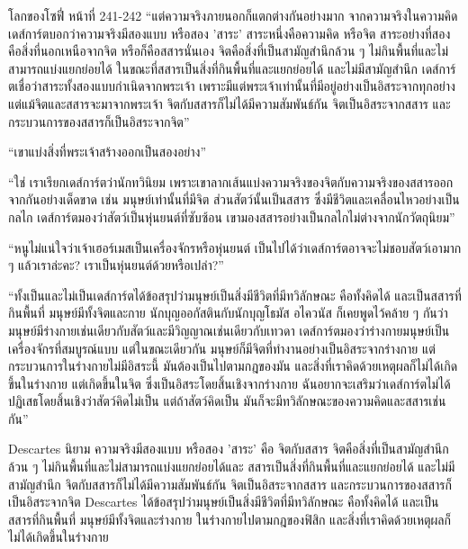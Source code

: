 \begin{bookquote}{โลกของโซฟี่ หน้าที่ 241-242}
“แต่ความจริงภายนอกก็แตกต่างกันอย่างมาก จากความจริงในความคิด เดส์การ์ตบอกว่าความจริงมีสองแบบ หรือสอง 'สาระ' สาระหนึ่งคือความคิด หรือจิต สาระอย่างที่สองคือสิ่งที่นอกเหนือจากจิต หรือก็คือสสารนั่นเอง จิตคือสิ่งที่เป็นสามัญสำนึกล้วน ๆ ไม่กินพื้นที่และไม่สามารถแบ่งแยกย่อยได้ ในขณะที่สสารเป็นสิ่งที่กินพื้นที่และแยกย่อยได้ และไม่มีสามัญสำนึก เดส์การ์ตเชื่อว่าสาระทั้งสองแบบกำเนิดจากพระเจ้า เพราะมีแต่พระเจ้าเท่านั้นที่มีอยู่อย่างเป็นอิสระจากทุกอย่าง แต่แม้จิตและสสารจะมาจากพระเจ้า จิตกับสสารก็ไม่ได้มีความสัมพันธ์กัน จิตเป็นอิสระจากสสาร และกระบวนการของสสารก็เป็นอิสระจากจิต”

“เขาแบ่งสิ่งที่พระเจ้าสร้างออกเป็นสองอย่าง”

“ใช่ เราเรียกเดส์การ์ตว่านักทวินิยม เพราะเขาลากเส้นแบ่งความจริงของจิตกับความจริงของสสารออกจากกันอย่างเด็ดขาด เช่น มนุษย์เท่านั้นที่มีจิต ส่วนสัตว์นั้นเป็นสสาร ซึ่งมีชีวิตและเคลื่อนไหวอย่างเป็นกลไก เดส์การ์ตมองว่าสัตว์เป็นหุ่นยนต์ที่ซับซ้อน เขามองสสารอย่างเป็นกลไกไม่ต่างจากนักวัตถุนิยม”

“หนูไม่แน่ใจว่าเจ้าเฮอร์เมสเป็นเครื่องจักรหรือหุ่นยนต์ เป็นไปได้ว่าเดส์การ์ตอาจจะไม่ชอบสัตว์เอามาก ๆ แล้วเราล่ะคะ? เราเป็นหุ่นยนต์ด้วยหรือเปล่า?”

“ทั้งเป็นและไม่เป็นเดส์การ์ตได้ข้อสรุปว่ามนุษย์เป็นสิ่งมีชีวิตที่มีทวิลักษณะ คือทั้งคิดได้ และเป็นสสารที่กินพื้นที่ มนุษย์มีทั้งจิตและกาย นักบุญออกัสตินกับนักบุญโธมัส อไควนัส ก็เคยพูดไว้คล้าย ๆ กันว่ามนุษย์มีร่างกายเช่นเดียวกับสัตว์และมีวิญญาณเช่นเดียวกับเทวดา เดส์การ์ตมองว่าร่างกายมนุษย์เป็นเครื่องจักรที่สมบูรณ์แบบ แต่ในขณะเดียวกัน มนุษย์ก็มีจิตที่ทำงานอย่างเป็นอิสระจากร่างกาย แต่กระบวนการในร่างกายไม่มีอิสระนี้ มันต้องเป็นไปตามกฎของมัน และสิ่งที่เราคิดด้วยเหตุผลก็ไม่ได้เกิดขึ้นในร่างกาย แต่เกิดขึ้นในจิต ซึ่งเป็นอิสระโดยสิ้นเชิงจากร่างกาย ฉันอยากจะเสริมว่าเดส์การ์ตไม่ได้ปฏิเสธโดยสิ้นเชิงว่าสัตว์คิดไม่เป็น แต่ถ้าสัตว์คิดเป็น มันก็จะมีทวิลักษณะของความคิดและสสารเช่นกัน”
\end{bookquote}

Descartes นิยาม ความจริงมีสองแบบ หรือสอง ’สาระ’ คือ จิตกับสสาร
จิตคือสิ่งที่เป็นสามัญสํานึกล้วน ๆ ไม่กินพื้นที่และไม่สามารถแบ่งแยกย่อยได้และ
สสารเป็นสิ่งที่กินพื้นที่และแยกย่อยได้ และไม่มีสามัญสํานึก
จิตกับสสารก็ไม่ได้มีความสัมพันธ์กัน จิตเป็นอิสระจากสสาร และกระบวนการของสสารก็เป็นอิสระจากจิต
Descartes ได้ข้อสรุปว่ามนุษย์เป็นสิ่งมีชีวิตที่มีทวิลักษณะ คือทั้งคิดได้ และเป็นสสารที่กินพื้นที่ มนุษย์มีทั้งจิตและร่างกาย
ในร่างกายไปตามกฎของฟิสิก และสิ่งที่เราคิดด้วยเหตุผลก็ไม่ได้เกิดขึ้นในร่างกาย

